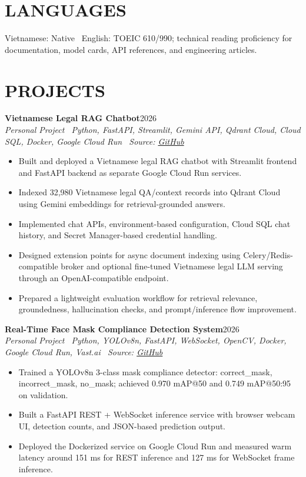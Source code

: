 \documentclass[10pt,a4paper]{article}
\newenvironment{cvitems}{%
    \begin{itemize}[leftmargin=1.15em,itemsep=0pt,topsep=1pt,parsep=0pt]
}{%
    \end{itemize}
}
\newcommand{\entryhead}[2]{%
    \noindent\textbf{#1}\hfill #2\\[-2pt]
}
\newcommand{\entrysub}[1]{%
    \noindent\textit{#1}\\[-1pt]
}
\begin{document}
\section{LANGUAGES}
Vietnamese: Native \textbar\ English: TOEIC 610/990; technical reading proficiency for documentation, model cards, API references, and engineering articles.

\section{PROJECTS}
\entryhead{Vietnamese Legal RAG Chatbot}{2026}
\entrysub{Personal Project \textbar\ Python, FastAPI, Streamlit, Gemini API, Qdrant Cloud, Cloud SQL, Docker, Google Cloud Run \textbar\ Source: \href{https://github.com/NguyenKhacBao564/legal_RaG_Chatbot_VietNamese-System}{GitHub}}
\begin{cvitems}
    \item Built and deployed a Vietnamese legal RAG chatbot with Streamlit frontend and FastAPI backend as separate Google Cloud Run services.
    \item Indexed 32,980 Vietnamese legal QA/context records into Qdrant Cloud using Gemini embeddings for retrieval-grounded answers.
    \item Implemented chat APIs, environment-based configuration, Cloud SQL chat history, and Secret Manager-based credential handling.
    \item Designed extension points for async document indexing using Celery/Redis-compatible broker and optional fine-tuned Vietnamese legal LLM serving through an OpenAI-compatible endpoint.
    \item Prepared a lightweight evaluation workflow for retrieval relevance, groundedness, hallucination checks, and prompt/inference flow improvement.
\end{cvitems}

\entryhead{Real-Time Face Mask Compliance Detection System}{2026}
\entrysub{Personal Project \textbar\ Python, YOLOv8n, FastAPI, WebSocket, OpenCV, Docker, Google Cloud Run, Vast.ai \textbar\ Source: \href{https://github.com/NguyenKhacBao564/Real-Time-Face-Mask-Compliance-Detection-System}{GitHub}}
\begin{cvitems}
    \item Trained a YOLOv8n 3-class mask compliance detector: correct\_mask, incorrect\_mask, no\_mask; achieved 0.970 mAP@50 and 0.749 mAP@50:95 on validation.
    \item Built a FastAPI REST + WebSocket inference service with browser webcam UI, detection counts, and JSON-based prediction output.
    \item Deployed the Dockerized service on Google Cloud Run and measured warm latency around 151 ms for REST inference and 127 ms for WebSocket frame inference.
\end{cvitems}
\end{document}
